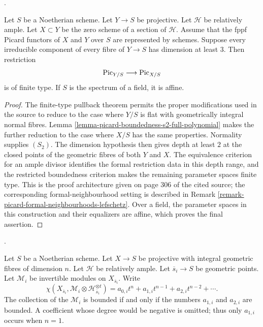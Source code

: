 \begin{theorem}
\label{theorem-picard-ample-divisor-restriction-finite-type}
\begin{reference}
\cite[Supplement to Expos\'e 236, (ii), pp. 304 and 306--307]{FGA}.
\end{reference}
Let $S$ be a Noetherian scheme. Let $Y \to S$ be projective. Let
$\mathcal{H}$ be relatively ample. Let $X \subset Y$ be the zero scheme of a
section of $\mathcal{H}$. Assume that the fppf Picard functors of $X$ and $Y$
over $S$ are represented by schemes. Suppose every irreducible component of
every fibre of $Y \to S$ has dimension at least $3$. Then restriction
$$
\mathrm{Pic}_{Y/S} \longrightarrow \mathrm{Pic}_{X/S}
$$
is of finite type. If $S$ is the spectrum of a field, it is affine.
\end{theorem}

\begin{proof}
The finite-type pullback theorem permits the proper modifications used in the
source to reduce to the case where $Y/S$ is flat with geometrically integral
normal fibres. Lemma
\ref{lemma-picard-boundedness-s2-full-polynomial} makes the further reduction
to the case where $X/S$ has the same properties. Normality supplies $(S_2)$.
The dimension hypothesis then gives depth at least $2$ at the closed points
of the geometric fibres of both $Y$ and $X$. The equivalence criterion for an
ample divisor identifies the formal restriction data in this depth range,
and the restricted boundedness criterion makes the remaining parameter
spaces finite type. This is the proof architecture given on page 306 of the
cited source; the corresponding formal-neighbourhood setting is described in
Remark
\ref{remark-picard-formal-neighbourhoods-lefschetz}.
Over a field, the parameter spaces in this construction and their
equalizers are affine, which proves the final assertion.
\end{proof}

\begin{theorem}
\label{theorem-picard-boundedness-integral-fibres}
\begin{reference}
\cite[Supplement to Expos\'e 236, (iii), pp. 304 and 306]{FGA}.
\end{reference}
Let $S$ be a Noetherian scheme. Let $X \to S$ be projective with integral
geometric fibres of dimension $n$. Let $\mathcal{H}$ be relatively ample. Let
$\overline{s}_i \to S$ be geometric points. Let $\mathcal{M}_i$ be invertible
modules on $X_{\overline{s}_i}$. Write
$$
\chi(X_{\overline{s}_i},
\mathcal{M}_i \otimes \mathcal{H}_{\overline{s}_i}^{\otimes t})
= a_{0, i}t^n + a_{1, i}t^{n-1} + a_{2, i}t^{n-2} + \cdots.
$$
The collection of the $\mathcal{M}_i$ is bounded if and only if the numbers
$a_{1, i}$ and $a_{2, i}$ are bounded. A coefficient whose degree would be
negative is omitted; thus only $a_{1, i}$ occurs when $n = 1$.
\end{theorem}

